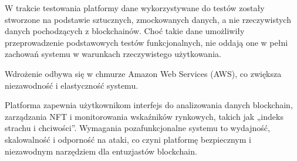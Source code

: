 W trakcie testowania platformy dane wykorzystywane do testów zostały stworzone na podstawie sztucznych, zmockowanych danych, a nie rzeczywistych danych pochodzących z blockchainów. Choć takie dane umożliwiły przeprowadzenie podstawowych testów funkcjonalnych, nie oddają one w pełni zachowań systemu w warunkach rzeczywistego użytkowania. 

Wdrożenie odbywa się w chmurze Amazon Web Services (AWS), co zwiększa niezawodność i elastyczność systemu.

Platforma zapewnia użytkownikom interfejs do analizowania danych blockchain, zarządzania NFT i monitorowania wskaźników rynkowych, takich jak „indeks strachu i chciwości”. Wymagania pozafunkcjonalne systemu to wydajność, skalowalność i odporność na ataki, co czyni platformę bezpiecznym i niezawodnym narzędziem dla entuzjastów blockchain.
